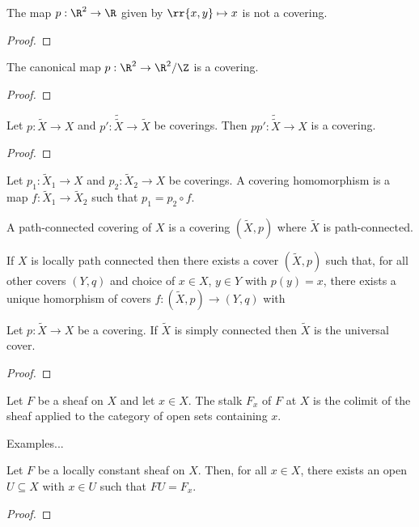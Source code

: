 \documentclass{article}
\begin{document}
\begin{example}
  The map $p:\R^2\to\R$ given by $\rr{x,y}\mapsto x$ is not a covering.
  \begin{proof}
    \missingproof
  \end{proof}
\end{example}

\begin{example}
  The canonical map $p:\R^2\to\R^2/\Z$ is a covering.
  \begin{proof}
    \missingproof
  \end{proof}
\end{example}

\begin{proposition}
  Let $p:\tilde X\to X$ and $p':\tilde{\tilde X}\to\tilde X$ be coverings.
  Then $pp':\tilde{\tilde{X}}\to X$ is a covering.
  \begin{proof}
    \missingproof
  \end{proof}
\end{proposition}

\begin{definition}
  Let $p_1:\tilde X_1\to X$ and $p_2:\tilde X_2\to X$ be coverings. A covering homomorphism
  is a map $f:\tilde X_1\to\tilde X_2$ such that $p_1 = p_2\circ f$.
\end{definition}

\begin{definition}
  A path-connected covering of $X$ is a covering $(\tilde X,p)$ where $\tilde X$ is
  path-connected.
\end{definition}

\begin{theorem}
  If $X$ is locally path connected then there exists a cover
  $(\tilde X,p)$ such that, for all other covers $(Y,q)$ and choice of $x\in X$, $y\in Y$
  with $p(y)=x$, there exists a unique homorphism of covers $f:(\tilde X,p)\to(Y,q)$
  with \missingdef
\end{theorem}

\begin{theorem}
  Let $p:\tilde X\to X$ be a covering. If $\tilde X$ is simply connected then
  $\tilde X$ is the universal cover.
  \begin{proof}
    \missingproof
  \end{proof}
\end{theorem}

\begin{definition}
  Let $F$ be a sheaf on $X$ and let $x\in X$. The stalk $F_x$ of $F$ at $X$ is the
  colimit of the sheaf applied to the category of open sets containing $x$.
\end{definition}

\begin{example}
  Examples...
\end{example}

\begin{lemma}
  Let $F$ be a locally constant sheaf on $X$. Then, for all $x\in X$, there exists
  an open $U\subseteq X$ with $x\in U$ such that $FU=F_x$.
  \begin{proof}
    \missingproof
  \end{proof}
\end{lemma}

\printbibliography
\end{document}
